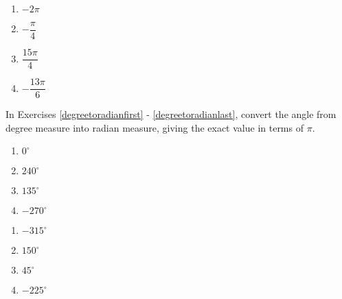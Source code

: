 \documentclass{ximera}
\begin{document}
\begin{multicols}{4} 

\begin{enumerate}

\setcounter{enumi}{\value{HW}}

\item  $-2\pi$ 
\item $-\dfrac{\pi}{4}$ 
\item $\dfrac{15\pi}{4}$
\item $-\dfrac{13\pi}{6}$ \label{orientedanglelast}

\setcounter{HW}{\value{enumi}}

\end{enumerate}

\end{multicols}

In Exercises \ref{degreetoradianfirst} - \ref{degreetoradianlast}, convert the angle from degree measure into radian measure, giving the exact value in terms of $\pi$.

\begin{multicols}{4} 

\begin{enumerate}

\setcounter{enumi}{\value{HW}}

\item $0^{\circ}$ \label{degreetoradianfirst}
\item $240^{\circ}$
\item $135^{\circ}$
\item $-270^{\circ}$

\setcounter{HW}{\value{enumi}}

\end{enumerate}

\end{multicols}

\begin{multicols}{4} 

\begin{enumerate}

\setcounter{enumi}{\value{HW}}

\item $-315^{\circ}$
\item $150^{\circ}$
\item $45^{\circ}$
\item $-225^{\circ}$ \label{degreetoradianlast}

\setcounter{HW}{\value{enumi}}

\end{enumerate}

\end{multicols}
\end{document}
